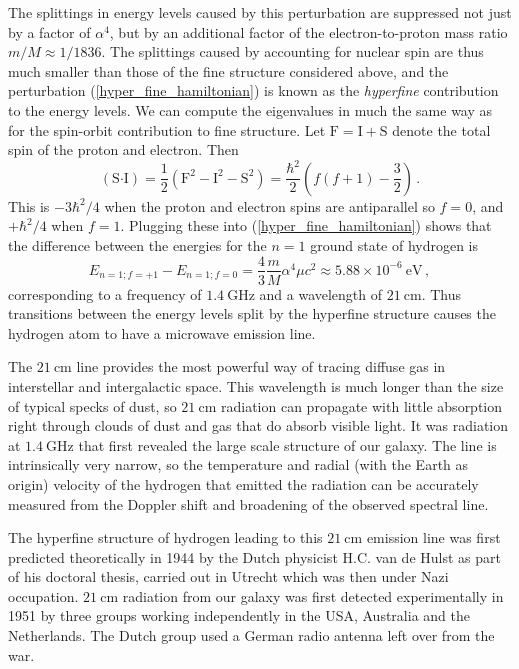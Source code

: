 \documentclass{article}
\theoremstyle{plain}\theoremheaderfont{\normalfont\itshape}\theorembodyfont{\rmfamily}\theoremseparator{.}\newtheorem*{rem}{Remark}\newtheorem*{ex}{Example}\newtheorem*{proof}{Proof}\newtheorem*{altp}{Alternative proof}
\theoremstyle{plain}\theoremheaderfont{\normalfont\bfseries}\theorembodyfont{\rmfamily}\theoremseparator{.}\newtheorem{thm}{Theorem}[section]\newtheorem{lem}[thm]{Lemma}\newtheorem{prop}[thm]{Proposition}\newtheorem*{cor}{Corollary}\newtheorem{defn}[thm]{Definition}\newtheorem{clm}[thm]{Claim}\newtheorem{clminproof}{Claim}
\theoremstyle{break}\theoremheaderfont{\normalfont\itshape}\theorembodyfont{\rmfamily}\theoremseparator{.\medskip}\newtheorem*{proofskip}{Proof}\newtheorem*{exs}{Examples}\newtheorem*{rems}{Remarks}
\theoremstyle{break}\theoremheaderfont{\normalfont\bfseries}\theorembodyfont{\rmfamily}\theoremseparator{.\medskip}\newtheorem{lemskip}[thm]{Lemma}\newtheorem{defnskip}[thm]{Definition}\newtheorem{propskip}[thm]{Proposition}\newtheorem{thmskip}[thm]{Theorem}
\numberwithin{equation}{section}
\newcommand{\unit}[1]{\ \mathrm{#1}}
\newcommand{\vb}[1]{\bm{\mathrm{#1}}}
\newcommand{\vdot}{\bm{\cdot}}
\begin{document}
    The splittings in energy levels caused by this perturbation are suppressed not just by a factor of \(\alpha^4\), but by an additional factor of the electron-to-proton mass ratio \(m/M\approx 1/1836\). The splittings caused by accounting for nuclear spin are thus much smaller than those of the fine structure considered above, and the perturbation (\ref{hyper_fine_hamiltonian}) is known as the \textit{hyperfine} contribution to the energy levels. We can compute the eigenvalues in much the same way as for the spin-orbit contribution to fine structure. Let \(\vb{F}=\vb{I}+\vb{S}\) denote the total spin of the proton and electron. Then
    \begin{equation}
        (\vb{S}\vdot\vb{I})=\frac{1}{2}(\vb{F}^2-\vb{I}^2-\vb{S}^2)=\frac{\hbar^2}{2}\left(f(f+1)-\frac{3}{2}\right)\,.
    \end{equation}
    This is \(-3\hbar^2/4\) when the proton and electron spins are antiparallel so \(f=0\), and \(+\hbar^2/4\) when \(f=1\). Plugging these into (\ref{hyper_fine_hamiltonian}) shows that the difference between the energies for the \(n=1\) ground state of hydrogen is
    \begin{equation}
        E_{n=1;f=+1}-E_{n=1;f=0}=\frac{4}{3}\frac{m}{M}\alpha^4\mu c^2\approx 5.88\times 10^{-6}\unit{eV}\,,
    \end{equation}
    corresponding to a frequency of \(1.4\unit{GHz}\) and a wavelength of \(21\unit{cm}\). Thus transitions between the energy levels split by the hyperfine structure causes the hydrogen atom to have a microwave emission line.

    The \(21\unit{cm}\) line provides the most powerful way of tracing diffuse gas in interstellar and intergalactic space. This wavelength is much longer than the size of typical specks of dust, so \(21\unit{cm}\) radiation can propagate with little absorption right through clouds of dust and gas that do absorb visible light. It was radiation at \(1.4\unit{GHz}\) that first revealed the large scale structure of our galaxy. The line is intrinsically very narrow, so the temperature and radial (with the Earth as origin) velocity of the hydrogen that emitted the radiation can be accurately measured from the Doppler shift and broadening of the observed spectral line.

    The hyperfine structure of hydrogen leading to this \(21\unit{cm}\) emission line was first predicted theoretically in 1944 by the Dutch physicist H.C. van de Hulst as part of his doctoral thesis, carried out in Utrecht which was then under Nazi occupation. \(21\unit{cm}\) radiation from our galaxy was first detected experimentally in 1951 by three groups working independently in the USA, Australia and the Netherlands. The Dutch group used a German radio antenna left over from the war.
\end{document}
